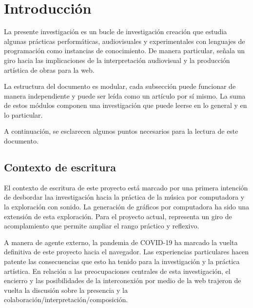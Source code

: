 



\chapter{Introducción}



La presente investigación es un bucle de investigación creación que estudia algunas prácticas performáticas, audiovisuales y experimentales con lenguajes de programación como instancias de conocimiento. De manera particular, señala un giro hacia las implicaciones de la interpretación audiovisual y la producción artística de obras para la web.

La estructura del documento es modular, cada subsección puede funcionar de manera independiente y puede ser leída como un artículo por sí mismo. La suma de estos módulos componen una investigación que puede leerse en lo general y en lo particular. 

A continuación, se esclarecen algunos puntos necesarios para la lectura de este documento. 


\section{Contexto de escritura} %

El contexto de escritura de este proyecto está marcado por una primera intención de desbordar laa investigación hacia la práctica de la música por computadora y la exploración con sonido. La generación de gráficos por computadora ha sido una extensión de esta exploración. Para el proyecto actual, representa un giro de acomplamiento que permite ampliar el rango práctico y reflexivo.

A manera de agente externo, la pandemia de COVID-19 ha marcado la vuelta definitiva de este proyecto hacia el navegador. Las experiencias particulares hacen patente las consecuencias que esto ha tenido para la investigación y la práctica artística. En relación a las preocupaciones centrales de esta investigación, el encierro y las posibilidades de la interconexión por medio de la web trajeron de vuelta la discusión sobre la presencia y la colaboración/interpretación/composición. 

